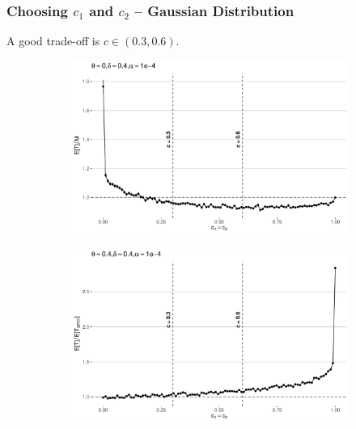 \documentclass[10pt]{beamer}
\begin{document}
\begin{frame}
\frametitle{Choosing $c_1$ and $c_2$ -- Gaussian Distribution}
A good trade-off is $c \in (0.3, 0.6)$.

\begin{figure}
\centering
\begin{subfigure}{0.5\textwidth}
    \includegraphics[width=\textwidth]{images/trunc_v_fss}
\end{subfigure}
\hfill
\begin{subfigure}{0.5\textwidth}
    \includegraphics[width=\textwidth]{images/trunc_v_sprt}
\end{subfigure}
\end{figure}

\end{frame}
\end{document}
